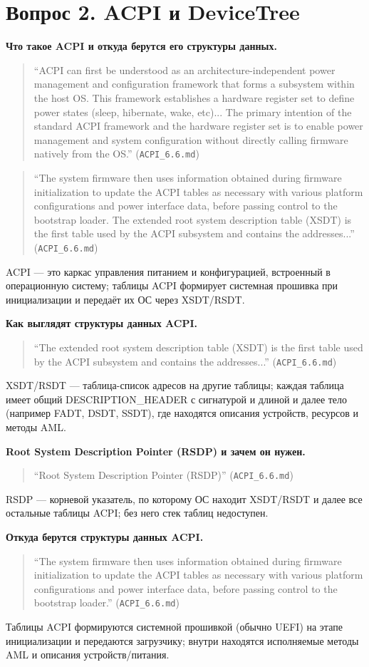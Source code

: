 \documentclass[a4paper,12pt]{article}
\begin{document}
\section*{Вопрос 2. ACPI и DeviceTree}
\textbf{Что такое ACPI и откуда берутся его структуры данных.}
\begin{quote}
``ACPI can first be understood as an architecture-independent power management and configuration framework that forms a subsystem within the host OS. This framework establishes a hardware register set to define power states (sleep, hibernate, wake, etc)... The primary intention of the standard ACPI framework and the hardware register set is to enable power management and system configuration without directly calling firmware natively from the OS.'' (\texttt{ACPI\_6.6.md})
\end{quote}
\begin{quote}
``The system firmware then uses information obtained during firmware initialization to update the ACPI tables as necessary with various platform configurations and power interface data, before passing control to the bootstrap loader. The extended root system description table (XSDT) is the first table used by the ACPI subsystem and contains the addresses...'' (\texttt{ACPI\_6.6.md})
\end{quote}
ACPI — это каркас управления питанием и конфигурацией, встроенный в операционную систему; таблицы ACPI формирует системная прошивка при инициализации и передаёт их ОС через XSDT/RSDT.

\textbf{Как выглядят структуры данных ACPI.}
\begin{quote}
``The extended root system description table (XSDT) is the first table used by the ACPI subsystem and contains the addresses...'' (\texttt{ACPI\_6.6.md})
\end{quote}
XSDT/RSDT — таблица-список адресов на другие таблицы; каждая таблица имеет общий DESCRIPTION\_HEADER с сигнатурой и длиной и далее тело (например FADT, DSDT, SSDT), где находятся описания устройств, ресурсов и методы AML.

\textbf{Root System Description Pointer (RSDP) и зачем он нужен.}
\begin{quote}
``Root System Description Pointer (RSDP)'' (\texttt{ACPI\_6.6.md})
\end{quote}
RSDP — корневой указатель, по которому ОС находит XSDT/RSDT и далее все остальные таблицы ACPI; без него стек таблиц недоступен.

\textbf{Откуда берутся структуры данных ACPI.} 
\begin{quote}
``The system firmware then uses information obtained during firmware initialization to update the ACPI tables as necessary with various platform configurations and power interface data, before passing control to the bootstrap loader.'' (\texttt{ACPI\_6.6.md})
\end{quote}
Таблицы ACPI формируются системной прошивкой (обычно UEFI) на этапе инициализации и передаются загрузчику; внутри находятся исполняемые методы AML и описания устройств/питания.
\end{document}
